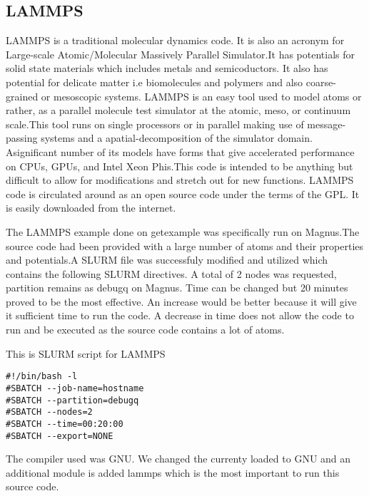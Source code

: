 \documentclass[journal]{IEEEtran}
\begin{document}
\subsection{LAMMPS}

LAMMPS is a traditional molecular dynamics code. It is also an acronym for Large-scale Atomic/Molecular Massively Parallel Simulator.It has potentials for solid state materials which includes metals and semicoductors. It also has potential for delicate matter i.e biomolecules and polymers and also coarse-grained or mesoscopic systems.
LAMMPS is an easy tool used to model atoms or rather, as a parallel molecule test simulator at the atomic, meso, or continuum scale.This tool runs on single processors or in parallel making use of message-passing systems and a apatial-decomposition of the simulator domain.
Asignificant number of its models have forms that give accelerated performance on CPUs, GPUs, and Intel Xeon Phis.This code is intended to be anything but difficult to allow for modifications and stretch out for new functions.
LAMMPS code is circulated around as an open source code under the terms of the GPL. It is easily downloaded from the internet.

The LAMMPS example done on getexample was specifically run on Magnus.The source code had been provided with a large number of atoms and their properties and potentials.A SLURM file was successfuly modified and utilized which contains the following SLURM directives.
A total of 2 nodes was requested, partition remains as debugq on Magnus. Time can be changed but 20 minutes proved to be the most effective. An increase would be better because it will give it sufficient time to run the code. A decrease in time does not allow the code to run and be executed as the source code contains a lot of atoms.


This is SLURM script for LAMMPS 


\begin{verbatim}
#!/bin/bash -l
#SBATCH --job-name=hostname
#SBATCH --partition=debugq
#SBATCH --nodes=2
#SBATCH --time=00:20:00
#SBATCH --export=NONE
\end{verbatim}

The compiler used was GNU. We changed the currenty loaded to GNU and an additional module is added lammps which is the most important to run this source code.
\end{document}
